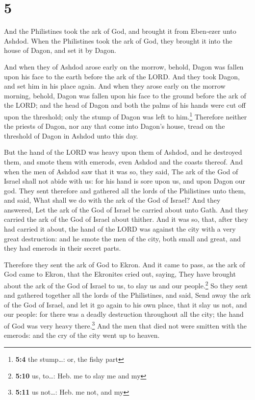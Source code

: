 \hypertarget{section-4}{%
\section{5}\label{section-4}}

 And the Philistines took the ark of God, and brought it
from Eben-ezer unto Ashdod.  When the Philistines took the
ark of God, they brought it into the house of Dagon, and set it by
Dagon.

 And when they of Ashdod arose early on the morrow,
behold, Dagon was fallen upon his face to the earth before the ark of
the LORD. And they took Dagon, and set him in his place again.
 And when they arose early on the morrow morning, behold,
Dagon was fallen upon his face to the ground before the ark of the LORD;
and the head of Dagon and both the palms of his hands were cut off upon
the threshold; only the stump of Dagon was left to him.\footnote{\textbf{5:4}
  the stump\ldots: or, the fishy part}  Therefore neither
the priests of Dagon, nor any that come into Dagon's house, tread on the
threshold of Dagon in Ashdod unto this day.

 But the hand of the LORD was heavy upon them of Ashdod,
and he destroyed them, and smote them with emerods, even Ashdod and the
coasts thereof.  And when the men of Ashdod saw that it
was so, they said, The ark of the God of Israel shall not abide with us:
for his hand is sore upon us, and upon Dagon our god. 
They sent therefore and gathered all the lords of the Philistines unto
them, and said, What shall we do with the ark of the God of Israel? And
they answered, Let the ark of the God of Israel be carried about unto
Gath. And they carried the ark of the God of Israel about thither.
 And it was so, that, after they had carried it about, the
hand of the LORD was against the city with a very great destruction: and
he smote the men of the city, both small and great, and they had emerods
in their secret parts.

 Therefore they sent the ark of God to Ekron. And it came
to pass, as the ark of God came to Ekron, that the Ekronites cried out,
saying, They have brought about the ark of the God of Israel to us, to
slay us and our people.\footnote{\textbf{5:10} us, to\ldots: Heb. me to
  slay me and my}  So they sent and gathered together all
the lords of the Philistines, and said, Send away the ark of the God of
Israel, and let it go again to his own place, that it slay us not, and
our people: for there was a deadly destruction throughout all the city;
the hand of God was very heavy there.\footnote{\textbf{5:11} us
  not\ldots: Heb. me not, and my}  And the men that died
not were smitten with the emerods: and the cry of the city went up to
heaven.

